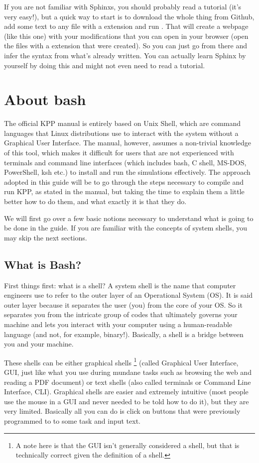 \documentclass[letterpaper,10pt,openany,oneside]{sphinxmanual}
\begin{document}
If you are not familiar with Sphinxs, you should probably read a tutorial (it's
very easy!), but a quick way to start is to download the whole thing from
Github, add some text to any file with a  extension and run . That will create a webpage (like this one) with your modifications that
you can open in your browser (open the files with a  extension that
were created). So you can just go from there and infer the syntax from what's
already written. You can actually learn Sphinx by yourself by doing this and
might not even need to read a tutorial.


\chapter{About bash}
\label{bash:about-bash}\label{bash::doc}
The official KPP manual is entirely based on Unix Shell, which are command
languages that Linux distributions use to interact with the system without a
Graphical User Interface. The manual, however, assumes a non-trivial knowledge
of this tool, which makes it difficult for users that are not experienced with
terminals and command line interfaces (which includes bash, C shell, MS-DOS,
PowerShell, ksh etc.) to install and run the simulations effectively. The
approach adopted in this guide will be to go through the steps necessary to
compile and run KPP, as stated in the manual, but taking the time to explain
them a little better how to do them, and what exactly it is that they do.

We will first go over a few basic notions necessary to understand what is going
to be done in the guide. If you are familiar with the concepts of system shells,
you may skip the next sections.


\section{What is Bash?}
\label{bash:what-is-bash}
First things first: what is a shell? A system shell is the name that computer
engineers use to refer to the outer layer of an Operational System (OS). It is
said outer layer because it separates the user (you) from the core of your OS.
So it separates you from the intricate group of codes that ultimately governs
your machine and lets you interact with your computer using a human-readable
language (and not, for example, binary!). Basically, a shell is a bridge
between you and your machine.

These shells can be either graphical shells \footnote[1]{\sphinxAtStartFootnote%
A note here is that the GUI isn't generally considered a shell, but
that is technically correct given the definition of a shell.
} (called Graphical User Interface,
GUI, just like what you use during mundane tasks such as browsing the web and
reading a PDF document) or text shells (also called terminals or Command Line
Interface, CLI). Graphical shells are easier and extremely intuitive (most
people use the mouse in a GUI and never needed to be told how to do it), but
they are very limited. Basically all you can do is click on buttons that were
previously programmed to to some task and input text.
\end{document}
